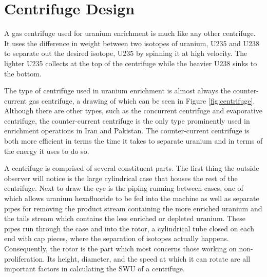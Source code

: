 \section{Centrifuge Design}
\label{s_centrifuge}
A gas centrifuge used for uranium enrichment is much like any other centrifuge. It uses the difference in weight between two isotopes of uranium, \gls{U235} and \gls{U238} to separate out the desired isotope, \gls{U235} by spinning it at high velocity. The lighter \gls{U235} collects at the top of the centrifuge while the heavier \gls{U238} sinks to the bottom.

\iffalse
\begin{figure}%
\texttt{[image: ./figs/centrifuge.png]}
\caption{A Nuclear Regulatory Commission Diagram of a Simple Gas Centrifuge}
\label{fig:likely}
\end{figure}
\fi

The type of centrifuge used in uranium enrichment is almost always the counter-current gas centrifuge, a drawing of which can be seen in Figure \ref{fig:centrifuge}. Although there are other types, such as the concurrent centrifuge and evaporative centrifuge, the counter-current centrifuge is the only type prominently used in enrichment operations in Iran and Pakistan. The counter-current centrifuge is both more efficient in terms the time it takes to separate uranium and in terms of the energy it uses to do so.

A centrifuge is comprised of several constituent parts. The first thing the outside observer will notice is the large cylindrical case that houses the rest of the centrifuge. Next to draw the eye is the piping running between cases, one of which allows uranium hexafluoride to be fed into the machine as well as separate pipes for removing the product stream containing the more enriched uranium and the tails stream which contains the less enriched or depleted uranium. These pipes run through the case and into the rotor, a cylindrical tube closed on each end with cap pieces, where the separation of isotopes actually happens. Consequently, the rotor is the part which most concerns those working on non-proliferation. Its height, diameter, and the speed at which it can rotate are all important factors in calculating the \gls{SWU} of a centrifuge. 

